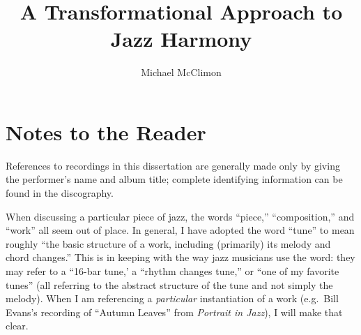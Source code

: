 \documentclass[diss]{subfiles}
\begin{document}
\title{A Transformational Approach to Jazz Harmony}
\author{Michael McClimon}
\date{}
\maketitle

\clearpage
\section{Notes to the Reader}

References to recordings in this dissertation are generally made only by
giving the performer’s name and album title; complete identifying information
can be found in the discography.

When discussing a particular piece of jazz, the words “piece,” “composition,”
and “work” all seem out of place. In general, I have adopted the word “tune”
to mean roughly “the basic structure of a work, including (primarily) its
melody and chord changes.” This is in keeping with the way jazz musicians use
the word: they may refer to a “16-bar tune,' a “rhythm changes tune,” or “one
of my favorite tunes” (all referring to the abstract structure of the tune and
not simply the melody). When I am referencing a \emph{particular}
instantiation of a work (e.g.~Bill Evans’s recording of “Autumn Leaves” from
\emph{Portrait in Jazz}), I will make that clear.
\end{document}
